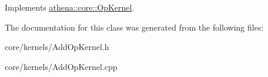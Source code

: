 Implements \mbox{\hyperlink{classathena_1_1core_1_1_op_kernel_a762e541463ffd089b47a8e6755c30fe1}{athena\+::core\+::\+Op\+Kernel}}.



The documentation for this class was generated from the following files\+:\begin{DoxyCompactItemize}
\item 
core/kernels/Add\+Op\+Kernel.\+h\item 
core/kernels/Add\+Op\+Kernel.\+cpp\end{DoxyCompactItemize}

